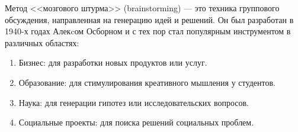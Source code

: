 Метод <<мозгового штурма>> (brainstorming) — это техника группового обсуждения, направленная на генерацию идей и решений. Он был разработан в 1940-х годах Алекcом Осборном и с тех пор стал популярным инструментом в различных областях:

\begin{enumerate}

\item Бизнес: для разработки новых продуктов или услуг.
\item Образование: для стимулирования креативного мышления у студентов.
\item Наука: для генерации гипотез или исследовательских вопросов.
\item Социальные проекты: для поиска решений социальных проблем.

\end{enumerate}
